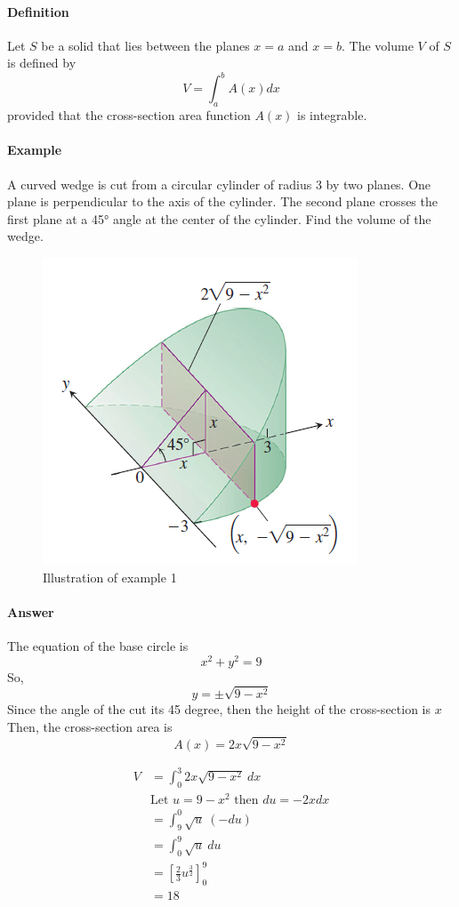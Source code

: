 \documentclass[12pt]{article}
\begin{document}
\paragraph{Definition}
Let $S$ be a solid that lies between the planes $x = a$ and $x = b$. The volume $V$ of $S$ is defined by
\[
    V = \int_a^b A(x) dx
\]
provided that the cross-section area function $A(x)$ is integrable.
\paragraph{Example}
A curved wedge is cut from a circular cylinder of radius 3 by two
planes. One plane is perpendicular to the axis of the cylinder. The second plane crosses the
first plane at a 45° angle at the center of the cylinder. Find the volume of the wedge.
\begin{figure}[H]
    \centering
    \includegraphics[width = 0.3\linewidth]{Images/cross-section ex1.png}
    \caption{Illustration of example 1}
\end{figure}

\paragraph{Answer}
The equation of the base circle is
\[
    x^2 + y^2 = 9
\]
So,
\[
    y = \pm \sqrt{9 - x^2}
\]
Since the angle of the cut its 45 degree, then the height of the cross-section is $x$
Then, the cross-section area is 
\[
    A(x) = 2x \sqrt{9 - x^2}
\]

\begin{align*} 
    V &= \int_0^3 2x \sqrt{9 - x^2}\: dx \\
    &\textrm{Let $u = 9-x^2$ then $du = - 2x dx$}\\
    &= \int_9^0 \sqrt{u}\: ( - du)\,\\
    &= \int_0^9 \sqrt{u}\: du \\
    &= \left[\frac{2}{3} u^{\frac{3}{2}}\right]^9_0 \\
    &= 18
\end{align*}
\end{document}
